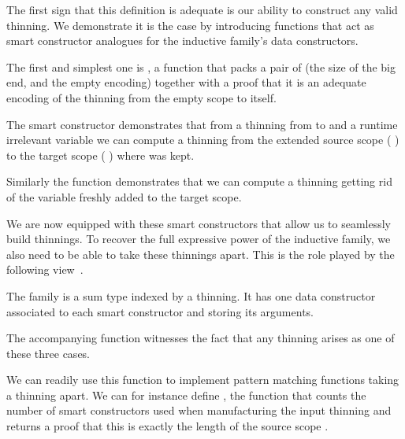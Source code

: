 \documentclass{article}
\begin{document}

The first sign that this definition is adequate is our ability to construct
any valid thinning. We demonstrate it is the case by introducing functions
that act as smart constructor analogues for the inductive family's data
constructors.

The first and simplest one is , a function that packs a pair of
 (the size of the big end, and the empty encoding) together with a proof
that it is an adequate encoding of the thinning from the empty scope to itself.


The  smart constructor demonstrates that from a thinning from
 to  and a runtime irrelevant variable 
we can compute a thinning from the extended source scope
( \IdrisData{:<} ) to the target scope
( \IdrisData{:<} ) where  was kept.


Similarly the  function demonstrates that we can compute a
thinning getting rid of the variable  freshly added to the target
scope.





We are now equipped with these smart constructors that allow us to seamlessly
build thinnings.
%
To recover the full expressive power of the inductive family, we also need to
be able to take these thinnings apart. This is the role played by the following
view~\cite{DBLP:journals/jfp/McBrideM04}.

The  family is a sum type indexed by a thinning. It has one
data constructor associated to each smart constructor and storing its arguments.


The accompanying  function witnesses the fact that any
thinning arises as one of these three cases.


We can readily use this function to implement pattern matching functions taking
a thinning apart. We can for instance define , the function
that counts the number of  smart constructors used when
manufacturing the input thinning and returns a proof that this is exactly the
length of the source scope .
\end{document}
